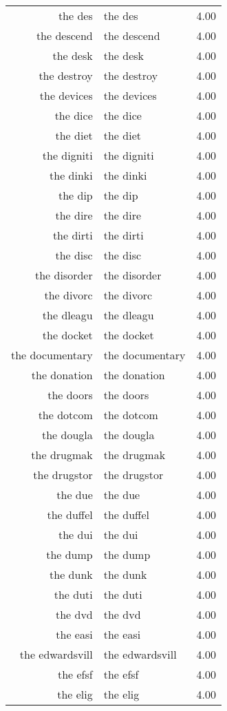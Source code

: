 \begin{table}[ht]
\begin{tabular}{rlr}
  the des & the des & 4.00 \\ 
  the descend & the descend & 4.00 \\ 
  the desk & the desk & 4.00 \\ 
  the destroy & the destroy & 4.00 \\ 
  the devices & the devices & 4.00 \\ 
  the dice & the dice & 4.00 \\ 
  the diet & the diet & 4.00 \\ 
  the digniti & the digniti & 4.00 \\ 
  the dinki & the dinki & 4.00 \\ 
  the dip & the dip & 4.00 \\ 
  the dire & the dire & 4.00 \\ 
  the dirti & the dirti & 4.00 \\ 
  the disc & the disc & 4.00 \\ 
  the disorder & the disorder & 4.00 \\ 
  the divorc & the divorc & 4.00 \\ 
  the dleagu & the dleagu & 4.00 \\ 
  the docket & the docket & 4.00 \\ 
  the documentary & the documentary & 4.00 \\ 
  the donation & the donation & 4.00 \\ 
  the doors & the doors & 4.00 \\ 
  the dotcom & the dotcom & 4.00 \\ 
  the dougla & the dougla & 4.00 \\ 
  the drugmak & the drugmak & 4.00 \\ 
  the drugstor & the drugstor & 4.00 \\ 
  the due & the due & 4.00 \\ 
  the duffel & the duffel & 4.00 \\ 
  the dui & the dui & 4.00 \\ 
  the dump & the dump & 4.00 \\ 
  the dunk & the dunk & 4.00 \\ 
  the duti & the duti & 4.00 \\ 
  the dvd & the dvd & 4.00 \\ 
  the easi & the easi & 4.00 \\ 
  the edwardsvill & the edwardsvill & 4.00 \\ 
  the efsf & the efsf & 4.00 \\ 
  the elig & the elig & 4.00 \\ 

\end{tabular}
\end{table}
